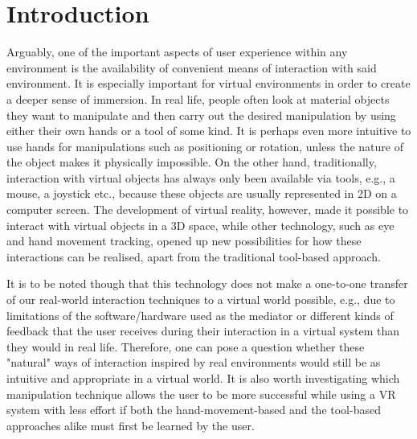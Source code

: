 \section{Introduction}
Arguably, one of the important aspects of user experience within any environment is the availability of convenient means of interaction with said environment. It is especially important for virtual environments in order to create a deeper sense of immersion. In real life, people often look at material objects they want to manipulate and then carry out the desired manipulation by using either their own hands or a tool of some kind. It is perhaps even more intuitive to use hands for manipulations such as positioning or rotation, unless the nature of the object makes it physically impossible. On the other hand, traditionally, interaction with virtual objects has always only been available via tools, e.g., a mouse, a joystick etc., because these objects are usually represented in 2D on a computer screen. The development of virtual reality, however, made it possible to interact with virtual objects in a 3D space, while other technology, such as eye and hand movement tracking, opened up new possibilities for how these interactions can be realised, apart from the traditional tool-based approach.

It is to be noted though that this technology does not make a one-to-one transfer of our real-world interaction techniques to a virtual world possible, e.g., due to limitations of the software/hardware used as the mediator or different kinds of feedback that the user receives during their interaction in a virtual system than they would in real life. Therefore, one can pose a question whether these "natural" ways of interaction inspired by real environments would still be as intuitive and appropriate in a virtual world. It is also worth investigating which manipulation technique allows the user to be more successful while using a VR system with less effort if both the hand-movement-based and the tool-based approaches alike must first be learned by the user.

